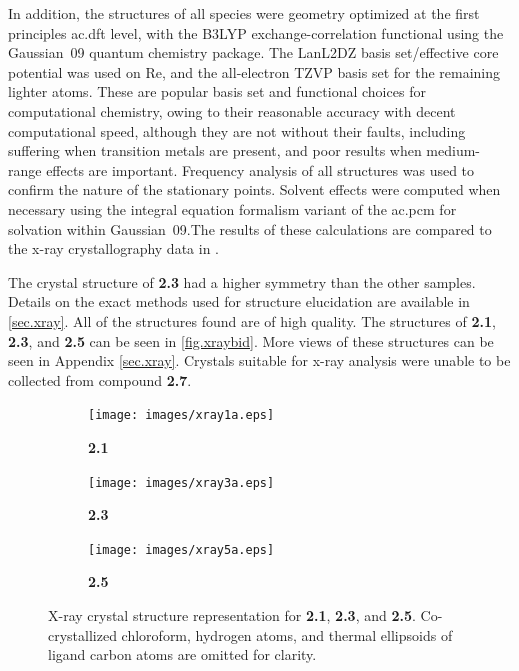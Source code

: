 In addition, the structures of all species were geometry optimized at the first principles \gls{ac.dft} level, with the B3LYP exchange-correlation functional\autocite{becke1993, lee1988} using the Gaussian~09 quantum chemistry package\autocite{gaussian}. The LanL2DZ basis set/effective core potential was used on Re\autocite{hay1985}, and the all-electron TZVP basis set for the remaining lighter atoms\autocite{schafer1994}. These are popular basis set and functional choices for computational chemistry, owing to their reasonable accuracy with decent computational speed\autocite{zhang2010}, although they are not without their faults, including suffering when transition metals are present, and poor results when medium-range effects are important\autocite{zhao2008}. Frequency analysis of all structures was used to confirm the nature of the stationary points. Solvent effects were computed when necessary using the integral equation formalism variant of the \gls{ac.pcm} for solvation within Gaussian~09\autocite{tomasi2005, scalmani2006}.The results of these calculations are compared to the x-ray crystallography data in .

The crystal structure of \textbf{2.3} had a higher symmetry than the other samples. Details on the exact methods used for structure elucidation are available in \autoref{sec.xray}. All of the structures found are of high quality. The structures of \textbf{2.1}, \textbf{2.3}, and \textbf{2.5} can be seen in \autoref{fig.xraybid}. More views of these structures can be seen in Appendix \autoref{sec.xray}. Crystals suitable for x-ray analysis were unable to be collected from compound \textbf{2.7}. 

\begin{figure}[!htb]
 \centering
 \begin{subfigure}[b]{0.49\textwidth}
  \texttt{[image: images/xray1a.eps]}
  \caption{\textbf{2.1}}
  \label{fig.da1}
 \end{subfigure}
 \begin{subfigure}[b]{0.49\textwidth}
  \texttt{[image: images/xray3a.eps]}
  \caption{\textbf{2.3}}
  \label{fig.da3}
 \end{subfigure}
 \begin{subfigure}[b]{0.49\textwidth}
  \texttt{[image: images/xray5a.eps]}
  \caption{\textbf{2.5}}
  \label{fig.da5}
 \end{subfigure}
\caption[X-ray crystal structure representation for \textbf{2.1}, \textbf{2.3} and \textbf{2.5}.]{X-ray crystal structure representation for \textbf{2.1}, \textbf{2.3}, and \textbf{2.5}. Co-crystallized chloroform, hydrogen atoms, and thermal ellipsoids of ligand carbon atoms are omitted for clarity.}
\label{fig.xraybid}
\end{figure}

